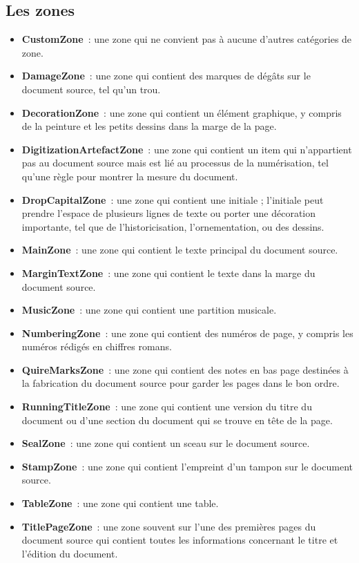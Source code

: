\documentclass[class=article, crop=false]{standalone}
\begin{document}
\subsection{Les zones}
\begin{itemize}
\item \textbf{CustomZone}~: une zone qui ne convient pas à aucune d'autres catégories de zone.
\item \textbf{DamageZone}~: une zone qui contient des marques de dégâts sur le document source, tel qu'un trou.
\item \textbf{DecorationZone}~: une zone qui contient un élément graphique, y compris de la peinture et les petits dessins dans la marge de la page.
\item \textbf{DigitizationArtefactZone}~: une zone qui contient un item qui n'appartient pas au document source mais est lié au processus de la numérisation, tel qu'une règle pour montrer la mesure du document. 
\item \textbf{DropCapitalZone}~: une zone qui contient une initiale ; l'initiale peut prendre l'espace de plusieurs lignes de texte ou porter une décoration importante, tel que de l'historicisation, l'ornementation, ou des dessins.
\item \textbf{MainZone}~: une zone qui contient le texte principal du document source.
\item \textbf{MarginTextZone}~: une zone qui contient le texte dans la marge du document source.
\item \textbf{MusicZone}~: une zone qui contient une partition musicale.
\item \textbf{NumberingZone}~: une zone qui contient des numéros de page, y compris les numéros rédigés en chiffres romans.
\item \textbf{QuireMarksZone}~: une zone qui contient des notes en bas page destinées à la fabrication du document source pour garder les pages dans le bon ordre.
\item \textbf{RunningTitleZone}~: une zone qui contient une version du titre du document ou d'une section du document qui se trouve en tête de la page.
\item \textbf{SealZone}~: une zone qui contient un sceau sur le document source.
\item \textbf{StampZone}~: une zone qui contient l'empreint d'un tampon sur le document source.
\item \textbf{TableZone}~: une zone qui contient une table. 
\item \textbf{TitlePageZone}~: une zone souvent sur l'une des premières pages du document source qui contient toutes les informations concernant le titre et l'édition du document.
\end{itemize}
\end{document}
